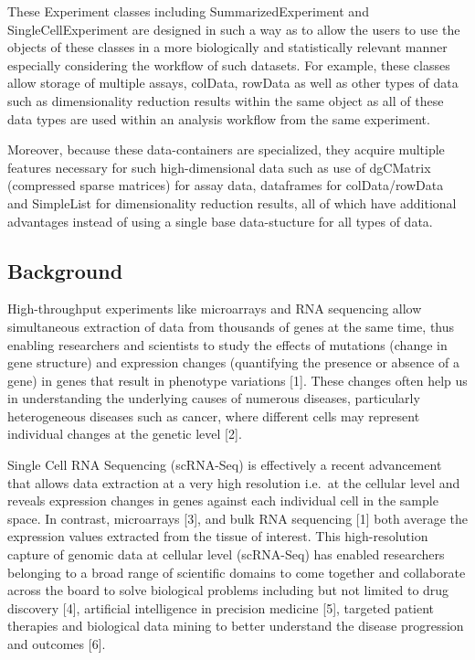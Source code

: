 \documentclass[
]{article}
\begin{document}
These Experiment classes including SummarizedExperiment and
SingleCellExperiment are designed in such a way as to allow the users to
use the objects of these classes in a more biologically and
statistically relevant manner especially considering the workflow of
such datasets. For example, these classes allow storage of multiple
assays, colData, rowData as well as other types of data such as
dimensionality reduction results within the same object as all of these
data types are used within an analysis workflow from the same
experiment.

Moreover, because these data-containers are specialized, they acquire
multiple features necessary for such high-dimensional data such as use
of dgCMatrix (compressed sparse matrices) for assay data, dataframes for
colData/rowData and SimpleList for dimensionality reduction results, all
of which have additional advantages instead of using a single base
data-stucture for all types of data.

\hypertarget{background}{%
\subsection{Background}\label{background}}

High-throughput experiments like microarrays and RNA sequencing allow
simultaneous extraction of data from thousands of genes at the same
time, thus enabling researchers and scientists to study the effects of
mutations (change in gene structure) and expression changes (quantifying
the presence or absence of a gene) in genes that result in phenotype
variations {[}1{]}. These changes often help us in understanding the
underlying causes of numerous diseases, particularly heterogeneous
diseases such as cancer, where different cells may represent individual
changes at the genetic level {[}2{]}.

Single Cell RNA Sequencing (scRNA-Seq) is effectively a recent
advancement that allows data extraction at a very high resolution
i.e.~at the cellular level and reveals expression changes in genes
against each individual cell in the sample space. In contrast,
microarrays {[}3{]}, and bulk RNA sequencing {[}1{]} both average the
expression values extracted from the tissue of interest. This
high-resolution capture of genomic data at cellular level (scRNA-Seq)
has enabled researchers belonging to a broad range of scientific domains
to come together and collaborate across the board to solve biological
problems including but not limited to drug discovery {[}4{]}, artificial
intelligence in precision medicine {[}5{]}, targeted patient therapies
and biological data mining to better understand the disease progression
and outcomes {[}6{]}.
\end{document}
